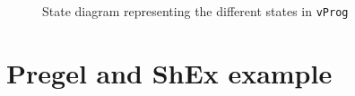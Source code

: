 \begin{figure}[ht]
    \centering
    
    \caption[State diagram representing the different states in \texttt{vProg}]{State diagram representing the different states in \texttt{vProg}~\cite{https://doi.org/10.48550/arxiv.2110.11709}}
    \label{fig:pregelState}
\end{figure}

\section{Pregel and ShEx example}